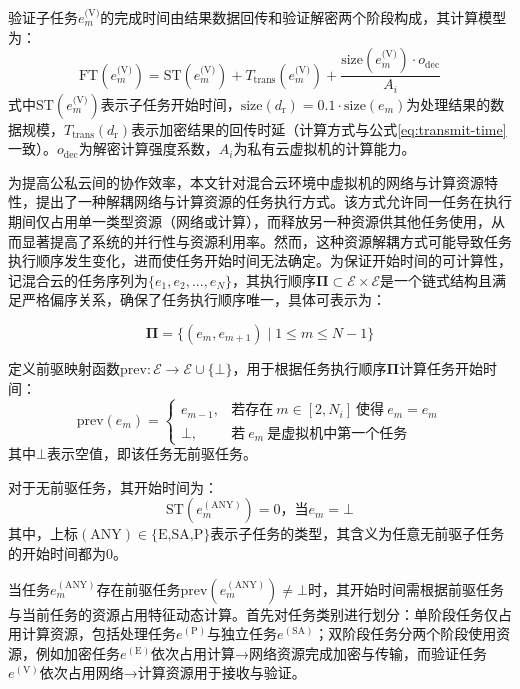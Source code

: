 验证子任务$e_m^\text{(V)}$的完成时间由结果数据回传和验证解密两个阶段构成，其计算模型为：
\begin{equation}
    \text{FT}(e_m^\text{(V)}) = \text{ST}(e_m^\text{(V)}) + T_{\text{trans}}(e_m^\text{(V)}) + \frac{\text{size}(e_m^\text{(V)}) \cdot o_{\text{dec}}}{A_i}
    \label{eq:verf-finish-time}
\end{equation}
式中$\text{ST}(e_m^\text{(V)})$表示子任务开始时间，$\text{size}(d_\text{r}) = 0.1 \cdot \text{size}(e_m)$为处理结果的数据规模，$T_{\text{trans}}(d_\text{r})$表示加密结果的回传时延（计算方式与公式\eqref{eq:transmit-time}一致）。$o_{\text{dec}}$为解密计算强度系数，$A_i$为私有云虚拟机的计算能力。

为提高公私云间的协作效率，本文针对混合云环境中虚拟机的网络与计算资源特性，提出了一种解耦网络与计算资源的任务执行方式。该方式允许同一任务在执行期间仅占用单一类型资源（网络或计算），而释放另一种资源供其他任务使用，从而显著提高了系统的并行性与资源利用率。然而，这种资源解耦方式可能导致任务执行顺序发生变化，进而使任务开始时间无法确定。为保证开始时间的可计算性，记混合云的任务序列为\( \{ e_1, e_2, ..., e_{N} \} \)，其执行顺序\( \mathbf{\Pi} \subset \mathcal{E} \times \mathcal{E} \)是一个链式结构且满足严格偏序关系，确保了任务执行顺序唯一，具体可表示为：

\begin{equation}
    \mathbf{\Pi} = \{(e_m, e_{m+1}) \mid 1 \leq m \leq N-1 \}
\end{equation}

定义前驱映射函数\( \text{prev}: \mathcal{E} \to \mathcal{E} \cup \{\bot\} \)，用于根据任务执行顺序\(\mathbf{\Pi}\)计算任务开始时间：
\begin{equation}
    \text{prev}(e_m) =
    \begin{cases}
        e_{m-1}, & \text{若存在}\ m \in [2, N_i]\ \text{使得}\ e_m = e_m \\
        \bot, & \text{若}\ e_m\ \text{是虚拟机中第一个任务}
    \end{cases}
    \label{eq:prev-func}
\end{equation}
其中\(\bot\)表示空值，即该任务无前驱任务。

对于无前驱任务，其开始时间为：
\begin{equation}
    \mathrm{ST}(e_m^{(\mathrm{ANY})}) = 0 \text{，当}e_m = \bot
\end{equation}
其中，上标\( (\mathrm{ANY}) \in \{\text{E,SA,P}\} \)表示子任务的类型，其含义为任意无前驱子任务的开始时间都为0。

当任务$e_m^{(\mathrm{ANY})}$存在前驱任务$\text{prev}(e_m^{(\mathrm{ANY})}) \neq \bot$时，其开始时间需根据前驱任务与当前任务的资源占用特征动态计算。首先对任务类别进行划分：单阶段任务仅占用计算资源，包括处理任务$e^{(\mathrm{P})}$与独立任务$e^{(\mathrm{SA})}$；双阶段任务分两个阶段使用资源，例如加密任务$e^{(\mathrm{E})}$依次占用计算→网络资源完成加密与传输，而验证任务$e^{(\mathrm{V})}$依次占用网络→计算资源用于接收与验证。

